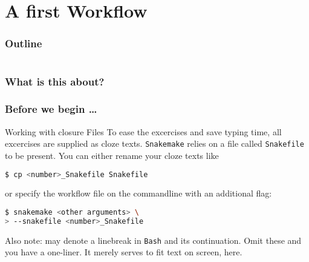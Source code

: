 \section{A first Workflow}

\begin{frame}
    \frametitle{Outline}
    \begin{columns}[t]
        \begin{column}{.5\textwidth}
            \tableofcontents[sections={1-9},currentsection]
        \end{column}
        \begin{column}{.5\textwidth}
            \tableofcontents[sections={10-18},currentsection]
        \end{column}
    \end{columns}
\end{frame}

\begin{frame}
  \frametitle{What is this about?}
\end{frame}

\begin{frame}[fragile]
  \frametitle{Before we begin \ldots}
  \begin{exampleblock}{Working with closure Files}
    To ease the excercises and save typing time, all excercises are supplied as cloze texts.\linebreak
    \texttt{Snakemake} relies on a file called \texttt{Snakefile} to be present. You can either rename your cloze texts like
    \begin{lstlisting}[language=Bash, style=Shell]
$ cp <number>_Snakefile Snakefile
    \end{lstlisting}
    or specify the workflow file on the commandline with an additional flag:
    \begin{lstlisting}[language=Bash, style=Shell]
$ snakemake <other arguments> \
> --snakefile <number>_Snakefile
    \end{lstlisting}
    Also note: \altverb{\\} may denote a linebreak in \texttt{Bash} and \altverb{>} its continuation. Omit these and you have a one-liner. It merely serves to fit text on screen, here.
  \end{exampleblock}
\end{frame}


